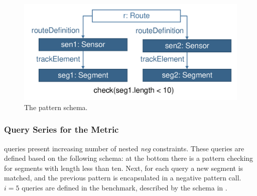 \begin{figure}[htb]
\begin{center}
    \includegraphics[scale=0.4]{figures/checks.pdf}
    \caption{The  pattern schema.}
    \label{fig:asechecks}
\end{center}
\end{figure}


\subsubsection{ Query Series for the  Metric}
 queries present increasing number of nested \emph{neg} constraints.
These queries are defined based on the following schema: at the bottom there is
a pattern checking for segments with length less than ten. Next, for each query
a new segment is matched, and the previous pattern is encapsulated in a negative
pattern call. $i=5$ queries are defined in the benchmark, described by the
schema in .

